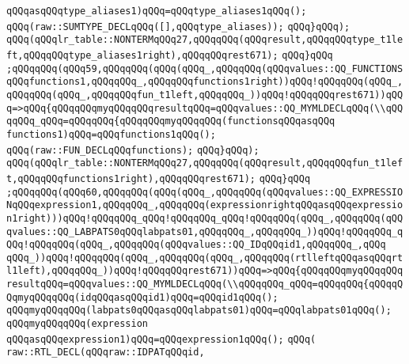 \verb|qQQqasqQQqtype_aliases1)qQQq=qQQqtype_aliases1qQQq();|\newline
\verb|qQQq(raw::SUMTYPE_DECLqQQq([],qQQqtype_aliases));|\newline
\verb|qQQq}qQQq);|\newline
\verb|qQQq(qQQqlr_table::NONTERMqQQq27,qQQqqQQq(qQQqresult,qQQqqQQqtype_t1left,qQQqqQQqtype_aliases1right),qQQqqQQqrest671);|\newline
\verb|qQQq}qQQq|\newline
\verb|;qQQqqQQq(qQQq59,qQQqqQQq(qQQq(qQQq_,qQQqqQQq(qQQqvalues::QQ_FUNCTIONSqQQqfunctions1,qQQqqQQq_,qQQqqQQqfunctions1right))qQQq!qQQqqQQq(qQQq_,qQQqqQQq(qQQq_,qQQqqQQqfun_t1left,qQQqqQQq_))qQQq!qQQqqQQqrest671))qQQq=>qQQq{qQQqqQQqmyqQQqqQQqresultqQQq=qQQqvalues::QQ_MYMLDECLqQQq(\\qQQqqQQq_qQQq=qQQqqQQq{qQQqqQQqmyqQQqqQQq(functionsqQQqasqQQq|\newline
\verb|functions1)qQQq=qQQqfunctions1qQQq();|\newline
\verb|qQQq(raw::FUN_DECLqQQqfunctions);|\newline
\verb|qQQq}qQQq);|\newline
\verb|qQQq(qQQqlr_table::NONTERMqQQq27,qQQqqQQq(qQQqresult,qQQqqQQqfun_t1left,qQQqqQQqfunctions1right),qQQqqQQqrest671);|\newline
\verb|qQQq}qQQq|\newline
\verb|;qQQqqQQq(qQQq60,qQQqqQQq(qQQq(qQQq_,qQQqqQQq(qQQqvalues::QQ_EXPRESSIONqQQqexpression1,qQQqqQQq_,qQQqqQQq(expressionrightqQQqasqQQqexpression1right)))qQQq!qQQqqQQq_qQQq!qQQqqQQq_qQQq!qQQqqQQq(qQQq_,qQQqqQQq(qQQqvalues::QQ_LABPATS0qQQqlabpats01,qQQqqQQq_,qQQqqQQq_))qQQq!qQQqqQQq_qQQq!qQQqqQQq(qQQq_,qQQqqQQq(qQQqvalues::QQ_IDqQQqid1,qQQqqQQq_,qQQq|\newline
\verb|qQQq_))qQQq!qQQqqQQq(qQQq_,qQQqqQQq(qQQq_,qQQqqQQq(rtlleftqQQqasqQQqrtl1left),qQQqqQQq_))qQQq!qQQqqQQqrest671))qQQq=>qQQq{qQQqqQQqmyqQQqqQQqresultqQQq=qQQqvalues::QQ_MYMLDECLqQQq(\\qQQqqQQq_qQQq=qQQqqQQq{qQQqqQQqmyqQQqqQQq(idqQQqasqQQqid1)qQQq=qQQqid1qQQq();|\newline
\verb|qQQqmyqQQqqQQq(labpats0qQQqasqQQqlabpats01)qQQq=qQQqlabpats01qQQq();|\newline
\verb|qQQqmyqQQqqQQq(expression|\newline
\verb|qQQqasqQQqexpression1)qQQq=qQQqexpression1qQQq();|\newline
\verb|qQQq(|\newline
\verb|raw::RTL_DECL(qQQqraw::IDPATqQQqid,|\newline
